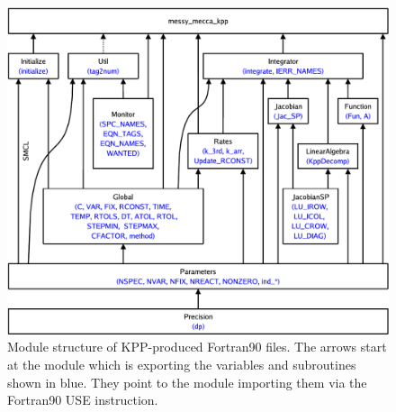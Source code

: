 \documentclass[twoside]{article}
\begin{document}
\begin{figure}
  \begin{center}
    \includegraphics[width=\textwidth]{kpp_use_diagr}
  \end{center}
  \caption{Module structure of KPP-produced Fortran90 files. The arrows
    start at the module which is exporting the variables and subroutines
    shown in blue. They point to the module importing them via the
    Fortran90 USE instruction.}
  \label{fig:kpp_use_diagr}
\end{figure}
\end{document}
